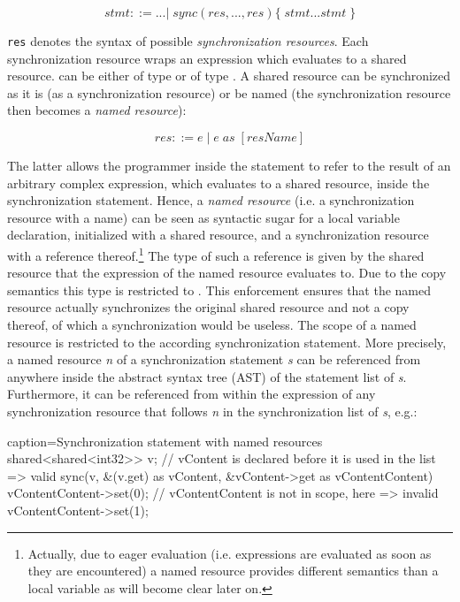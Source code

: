 \begin{equation}
\mathit{stmt} ::= ...
        |\;\mathit{sync}(res, ..., res) \{\;\mathit{stmt} ... \mathit{stmt}\;\}
\end{equation}
        
\texttt{res} denotes the syntax of possible \textit{synchronization resources}. Each synchronization resource  wraps an expression  which evaluates to a shared resource.  can be either of type  or of type . A shared resource can be synchronized as it is (as a synchronization resource) or be named (the synchronization resource then becomes a \textit{named resource}):

\begin{equation}
res ::= e\;|\;e\;\mathit{as}\;[\mathit{resName}]
\end{equation}

The latter allows the programmer inside the  statement to refer to the result of an arbitrary complex expression, which evaluates to a shared resource, inside the synchronization statement. Hence, a \textit{named resource} (i.e. a synchronization resource with a name) can be seen as syntactic sugar for a local variable declaration, initialized with a shared resource, and a synchronization resource with a reference thereof.\footnote{Actually, due to eager evaluation (i.e. expressions are evaluated as soon as they are encountered) a named resource provides different semantics than a local variable as will become clear later on.} The type of such a reference is given by the shared resource that the expression of the named resource evaluates to. Due to the copy semantics this type is restricted to . This enforcement ensures that the named resource actually synchronizes the original shared resource and not a copy thereof, of which a synchronization would be useless. The scope of a named resource is restricted to the according synchronization statement. More precisely, a named resource \textit{n} of a synchronization statement \textit{s} can be referenced from anywhere inside the abstract syntax tree (AST) of the statement list of \textit{s}. Furthermore, it can be referenced from within the expression of any synchronization resource that follows \textit{n} in the synchronization list of \textit{s}, e.g.:
\begin{ccode}{caption=Synchronization statement with named resources}
shared<shared<int32>> v;
// vContent is declared before it is used in the list => valid
sync(v, &(v.get) as vContent, &vContent->get as vContentContent) {
  vContentContent->set(0);
}
// vContentContent is not in scope, here => invalid
vContentContent->set(1);
\end{ccode}

